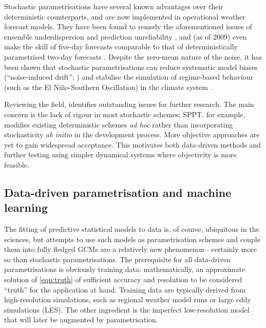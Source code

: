 \documentclass[titlepage,twoside]{article}
\numberwithin{equation}{section}
\begin{document}
Stochastic parametrisations have several known advantages over their
deterministic counterparts, and are now implemented in operational weather
forecast models. They have been found to remedy the aforementioned issues of
ensemble underdispersion and prediction unreliability
\parencite{palmer2005,berner2017}, and (as of 2009) even make the skill of
five-day forecasts comparable to that of deterministically parametrised two-day
forecasts \parencite{palmer2019}. Despite the zero-mean nature of the noise, it
has been shown that stochastic parametrisations can reduce systematic model
biases (``noise-induced drift''; \textcite{palmer2005}) and stabilise the
simulation of regime-based behaviour (such as the El Ni\~{n}o-Southern
Oscillation) in the climate system \parencite{berner2017}.

Reviewing the field, \textcite{palmer2019} identifies outstanding issues for
further research. The main concern is the lack of rigour in most stochastic
schemes; SPPT, for example, modifies existing deterministic schemes \emph{ad
hoc} rather than incorporating stochasticity \emph{ab initio} in the
development process. More objective approaches are yet to gain widespread
acceptance. This motivates both data-driven methods and further testing
using simpler dynamical systems where objectivity is more feasible.


\subsection{Data-driven parametrisation and machine learning}%
\label{sec:data_driven}
The fitting of predictive statistical models to data is, of course, ubiquitous
in the sciences, but attempts to use such models as parametrisation schemes and
couple them into fully fledged GCMs are a relatively new phenomenon---certainly
more so than stochastic parametrisations. The prerequisite for all data-driven
parametrisations is obviously training data: mathematically, an approximate
solution of \cref{eqn:truth} of sufficient accuracy and resolution to be
considered ``truth'' for the application at hand. Training data are typically
derived from high-resolution simulations, such as regional weather model runs
or large eddy simulations (LES). The other ingredient is the imperfect
low-resolution model that will later be augmented by parametrisation.
\end{document}
